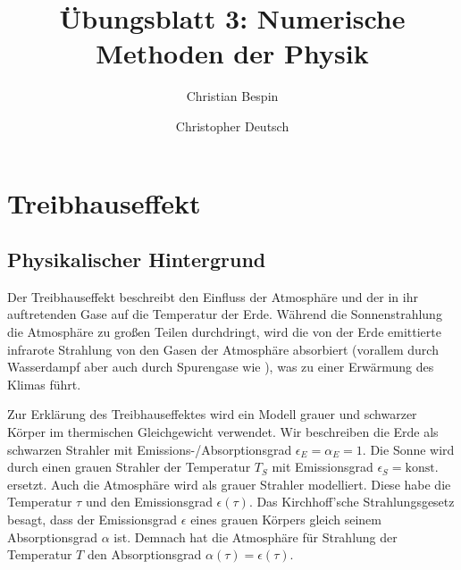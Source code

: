 \documentclass[10pt,a4paper]{article}
\author{Christian Bespin \and Christopher Deutsch}
\title{Übungsblatt 3: Numerische Methoden der Physik}
\begin{document}
\maketitle

\setcounter{section}{1}

\section{Treibhauseffekt}

\subsection{Physikalischer Hintergrund}
Der Treibhauseffekt beschreibt den Einfluss der Atmosphäre und der in ihr
auftretenden Gase auf die Temperatur der Erde. Während die Sonnenstrahlung die
Atmosphäre zu großen Teilen durchdringt, wird die von der Erde emittierte
infrarote Strahlung von den Gasen der Atmosphäre absorbiert (vorallem durch Wasserdampf
aber auch durch Spurengase wie ), was zu einer Erwärmung des Klimas führt.

Zur Erklärung des Treibhauseffektes wird ein Modell grauer und schwarzer Körper
im thermischen Gleichgewicht verwendet. Wir beschreiben die Erde als schwarzen
Strahler mit Emissions-/Absorptionsgrad $\epsilon_E = \alpha_E = 1$. Die Sonne 
wird durch einen grauen Strahler der Temperatur $T_S$ mit Emissionsgrad
$\epsilon_S = \text{konst.}$ ersetzt.
Auch die Atmosphäre wird als grauer Strahler modelliert. Diese habe die
Temperatur $\tau$ und den Emissionsgrad $\epsilon(\tau)$. 
Das Kirchhoff'sche Strahlungsgesetz besagt, dass der Emissionsgrad $\epsilon$ eines
grauen Körpers gleich seinem Absorptionsgrad $\alpha$ ist. Demnach hat die
Atmosphäre für Strahlung der Temperatur $T$ den Absorptionsgrad $\alpha(\tau) = \epsilon(\tau)$.
\end{document}
